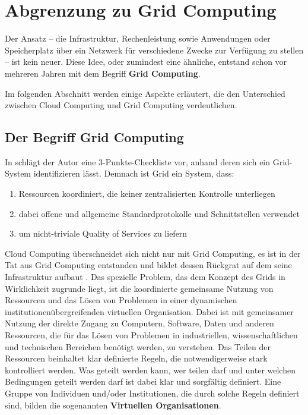 \section{Abgrenzung zu Grid Computing}
Der Ansatz -- die Infrastruktur, Rechenleistung sowie Anwendungen oder Speicherplatz über ein Netzwerk für verschiedene Zwecke zur Verfügung zu stellen -- ist kein neuer.
Diese Idee, oder zumindest eine ähnliche, entstand schon vor mehreren Jahren mit dem Begriff \textbf{Grid Computing}.

Im folgenden Abschnitt werden einige Aspekte erläutert, die den Unterschied zwischen Cloud Computing und Grid Computing verdeutlichen.
 
\subsection{Der Begriff \glqq Grid Computing\grqq}
In \cite{grid-checklist} schlägt der Autor eine 3-Punkte-Checkliste vor, anhand deren sich ein Grid-System identifizieren lässt. Demnach ist Grid ein System, dass:
\begin{enumerate}
  \item Ressourcen koordiniert, die keiner zentralisierten Kontrolle unterliegen
  \item dabei offene und allgemeine Standardprotokolle und Schnittstellen verwendet
  \item um nicht-triviale \glqq Quality of Services\grqq{} zu liefern
\end{enumerate}

Cloud Computing überschneidet sich nicht nur mit Grid Computing, es ist in der Tat aus Grid Computing entstanden und bildet dessen Rückgrat auf dem seine Infrastruktur aufbaut \cite{360-degree-compared}. Das spezielle Problem, das dem Konzept des Grids in Wirklichkeit zugrunde liegt,
ist die koordinierte gemeinsame Nutzung von Ressourcen und das Lösen von Problemen
in einer dynamischen institutionenübergreifenden virtuellen Organisation.
Dabei ist mit \glqq gemeinsamer Nutzung\grqq{} der direkte Zugang zu Computern, Software, Daten und anderen Ressourcen,
die für das Lösen von Problemen in industriellen, wissenschaftlichen und technischen Bereichen benötigt werden, zu verstehen.
Das Teilen der Ressourcen beinhaltet klar definierte Regeln, die notwendigerweise stark kontrolliert werden.
Was geteilt werden kann, wer teilen darf und unter welchen Bedingungen geteilt werden darf ist dabei klar und sorgfältig definiert.
Eine Gruppe von Individuen und/oder Institutionen, die durch solche Regeln definiert sind,
bilden die sogenannten \textbf{Virtuellen Organisationen}.\cite{anatomy-of-grid}

